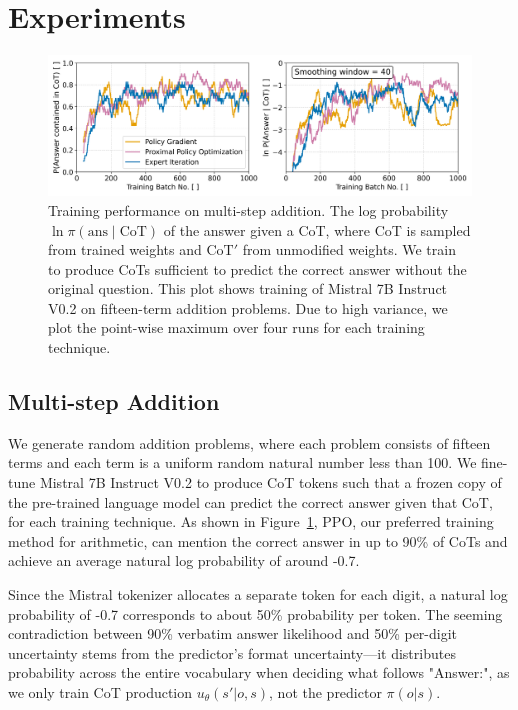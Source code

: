 \documentclass[letterpaper]{article} %
\begin{document}
\section{Experiments}
\label{sec:experiments}

\begin{figure}
\centering
    \includegraphics[width=\textwidth]{Figures/cot_performance_comparison.png}
    \caption{Training performance on multi-step addition. The log probability $\ln \pi(\text{ans} \mid \text{CoT})$ of the answer given a CoT, where CoT is sampled from trained weights and $\text{CoT}'$ from unmodified weights. We train to produce CoTs sufficient to predict the correct answer without the original question. This plot shows training of Mistral 7B Instruct V0.2 on fifteen-term addition problems. Due to high variance, we plot the point-wise maximum over four runs for each training technique.}
    \label{fig:arithmetic-results}
\end{figure}

\subsection{Multi-step Addition}
\label{subsec:solving}
We generate random addition problems, where each problem consists of fifteen terms and each term is a uniform random natural number less than 100. We fine-tune Mistral 7B Instruct V0.2 to produce CoT tokens such that a frozen copy of the pre-trained language model can predict the correct answer given that CoT, for each training technique. As shown in Figure~\ref{fig:arithmetic-results}, PPO, our preferred training method for arithmetic, can mention the correct answer in up to 90\% of CoTs and achieve an average natural log probability of around -0.7. 

Since the Mistral tokenizer allocates a separate token for each digit, a natural log probability of -0.7 corresponds to about 50\% probability per token. The seeming contradiction between 90\% verbatim answer likelihood and 50\% per-digit uncertainty stems from the predictor's format uncertainty—it distributes probability across the entire vocabulary when deciding what follows "Answer:", as we only train CoT production $u_\theta(s'|o,s)$, not the predictor $\pi(o|s)$.
\end{document}
